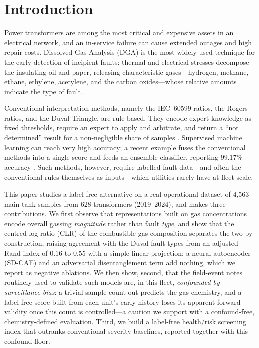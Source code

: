\section{Introduction}

Power transformers are among the most critical and expensive assets in an electrical
network, and an in-service failure can cause extended outages and high repair costs.
Dissolved Gas Analysis (DGA) is the most widely used technique for the early detection
of incipient faults: thermal and electrical stresses decompose the insulating oil and
paper, releasing characteristic gases---hydrogen, methane, ethane, ethylene, acetylene,
and the carbon oxides---whose relative amounts indicate the type of fault
\cite{ieee_c57104,duval2002review}.

Conventional interpretation methods, namely the IEC~60599 ratios, the Rogers ratios, and
the Duval Triangle, are rule-based. They encode expert knowledge as fixed thresholds,
require an expert to apply and arbitrate, and return a ``not determined'' result for a
non-negligible share of samples \cite{iec60599,duval2002review}. Supervised machine
learning can reach very high accuracy; a recent example fuses the conventional methods
into a single score and feeds an ensemble classifier, reporting $99.17\%$ accuracy
\cite{hybrid_aiscore2026}. Such methods, however, require labelled fault data---and often
the conventional rules themselves as inputs---which utilities rarely have at fleet scale.

This paper studies a label-free alternative on a real operational dataset of 4{,}563 main-tank
samples from 628 transformers (2019--2024), and makes three contributions. We first observe
that representations built on gas concentrations encode overall gassing \emph{magnitude} rather
than fault \emph{type}, and show that the centred log-ratio (CLR) of the combustible-gas
composition separates the two by construction, raising agreement with the Duval fault types
from an adjusted Rand index of $0.16$ to $0.55$ with a simple linear projection; a neural
autoencoder (SD-CAE) and an adversarial disentanglement term add nothing, which we report as
negative ablations. We then show, second, that the
field-event notes routinely used to validate such models are, in this fleet, \emph{confounded by
surveillance bias}: a trivial sample count out-predicts the gas chemistry, and a label-free score
built from each unit's early history loses its apparent forward validity once this count is
controlled---a caution we support with a confound-free,
chemistry-defined evaluation. Third, we build a label-free health/risk screening index that
outranks conventional severity baselines, reported together with this confound floor.

